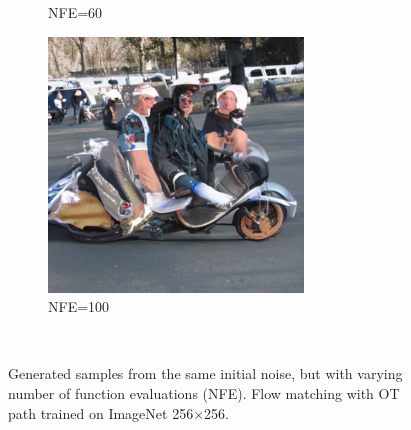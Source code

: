 \documentclass{article}
\begin{document}
\begin{figure}
\begin{subfigure}[b]{0.19\linewidth}
    \caption*{NFE=60}
    \end{subfigure}
    \begin{subfigure}[b]{0.19\linewidth}
    \includegraphics[width=\linewidth]{figures/imagenet256/solver_samples/imagenet256_fm_ot_17_50.png}
    \caption*{NFE=100}
    \end{subfigure}\\
    
    
    \caption{Generated samples from the same initial noise, but with varying number of function evaluations (NFE). Flow matching with OT path trained on ImageNet 256$\times $256.}
    \label{fig:imagenet256_solver_samples}
\end{figure}
\end{document}
